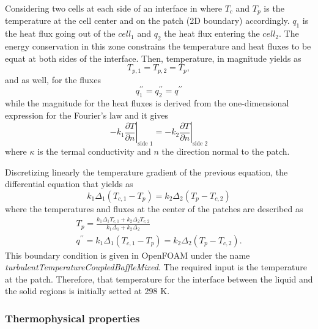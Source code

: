 \noindent Considering two cells at each side of an interface in where $T_c$ and $T_p$ is the temperature at the cell center and on the patch (2D boundary) accordingly. $q_1$ is the heat flux going out of the $cell_1$ and $q_2$ the heat flux entering the $cell_2$. The energy conservation in this zone constrains the temperature and heat fluxes to be equat at both sides of the interface. 
Then, temperature, in magnitude yields as
\begin{equation}
	T_{p, 1}=T_{p, 2}=T_{p},
	\label{4.9}
\end{equation}
and as well, for the fluxes
\begin{equation}
	q_{1}^{\prime \prime}=q_{2}^{\prime \prime}=q^{\prime \prime}
	\label{4.10}
\end{equation}
while the magnitude for the heat fluxes is derived from the one-dimensional expression for the Fourier's law and it gives
\begin{equation}
	-\left.k_{1} \frac{\partial T}{\partial n}\right|_{\text {side } 1}=-\left.k_{2} \frac{\partial T}{\partial n}\right|_{\text {side } 2}
	\label{4.11}
\end{equation}
where $\kappa$ is the termal conductivity and $n$ the direction normal to the patch.

\noindent Discretizing linearly the temperature gradient of the previous equation, the differential equation that yields as
\begin{equation}
	k_{1} \Delta_{1}\left(T_{c, 1}-T_{p}\right)=k_{2} \Delta_{2}\left(T_{p}-T_{c, 2}\right)
	\label{4.12}
\end{equation}
where the temperatures and fluxes at the center of the patches are described as
\begin{equation}
	\begin{gathered}
	T_{p}=\frac{k_{1} \Delta_{1} T_{c, 1}+k_{2} \Delta_{2} T_{c, 2}}{k_{1} \Delta_{1}+k_{2} \Delta_{2}} \\
	q^{\prime \prime}=k_{1} \Delta_{1}\left(T_{c, 1}-T_{p}\right)=k_{2} \Delta_{2}\left(T_{p}-T_{c, 2}\right) .
	\end{gathered}
	\label{4.13}
\end{equation}
This boundary condition is given in OpenFOAM under the name \textit{turbulentTemperatureCoupledBaffleMixed}. The required input is the temperature at the patch. Therefore, that temperature for the interface between the liquid and the solid regions is initially setted at 298 K.

\subsubsection{Thermophysical properties}


